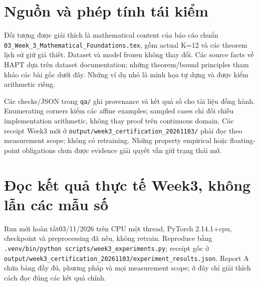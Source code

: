 \documentclass[11pt,a4paper]{article}
\newcommand{\code}[1]{{\small\ttfamily\nolinkurl{#1}}}
\theoremstyle{definition}
\begin{document}
\section{Nguồn và phép tính tái kiểm}
Đối tượng được giải thích là mathematical content của báo cáo chuẩn
\code{03_Week_3_Mathematical_Foundations.tex}, gồm actual K=12 và các theorem lịch sử giữ giả thiết. Dataset và model frozen không thay đổi. Các source facts về HAPT dựa trên dataset documentation;
những theorem/bound principles tham khảo các bài gốc dưới đây. Những ví dụ
nhỏ là minh họa tự dựng và được kiểm arithmetic riêng.

Các checks/JSON trong \code{qa/} ghi provenance và kết quả số cho tài liệu
đồng hành. Enumerating corners kiểm các affine examples; sampled cases chỉ
đối chiếu implementation arithmetic, không thay proof trên continuous domain.
Các receipt Week3 mới ở
\code{output/week3_certification_20261103/} phải đọc theo measurement scope; không có retraining. Những property empirical hoặc floating-point obligations chưa được evidence giải quyết vẫn giữ trạng thái mở.

\section*{Đọc kết quả thực tế Week3, không lẫn các mẫu số}
Run mới hoàn tất03/11/2026 trên CPU một thread, PyTorch 2.14.1+cpu,
checkpoint và preprocessing đã nêu, không retrain. Reproduce bằng
\code{.venv/bin/python scripts/week3_experiments.py}; receipt gốc ở
\code{output/week3_certification_20261103/experiment_results.json}.
Report A chứa bảng đầy đủ, phương pháp và mọi measurement scope; ở đây
chỉ giải thích cách đọc đúng các kết quả chính.
\end{document}
